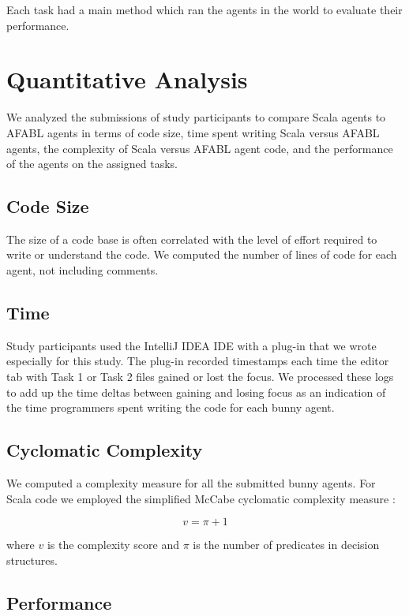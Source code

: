 Each task had a main method which ran the agents in the world to evaluate their performance.

\section{Quantitative Analysis}

We analyzed the submissions of study participants to compare Scala agents to AFABL agents in terms of code size, time spent writing Scala versus AFABL agents, the complexity of Scala versus AFABL agent code, and the performance of the agents on the assigned tasks.

\subsection{Code Size}

The size of a code base is often correlated with the level of effort required to write or understand the code. We computed the number of lines of code for each agent, not including comments.

\subsection{Time}

Study participants used the IntelliJ IDEA IDE with a plug-in that we wrote especially for this study. The plug-in recorded timestamps each time the editor tab with Task 1 or Task 2 files gained or lost the focus. We processed these logs to add up the time deltas between gaining and losing focus as an indication of the time programmers spent writing the code for each bunny agent.

\subsection{Cyclomatic Complexity}

We computed a complexity measure for all the submitted bunny agents. For Scala code we employed the simplified McCabe cyclomatic complexity measure \cite{mccabe1976complexity}:

\begin{equation}
v = \pi + 1
\end{equation}

where $v$ is the complexity score and $\pi$ is the number of predicates in decision structures.

\subsection{Performance}

